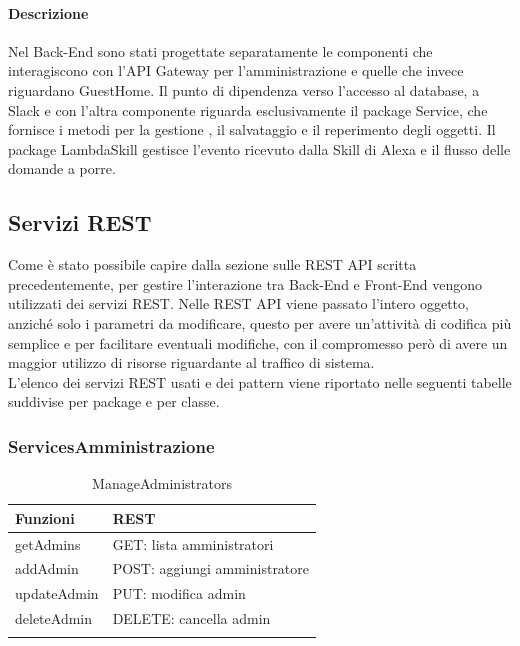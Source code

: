 \documentclass[../DefinizioneDiProdotto.tex]{subfiles}
\begin{document}
		\paragraph{Descrizione}

		Nel Back-End sono stati progettate separatamente le componenti che interagiscono con l'API Gateway per l'amministrazione e quelle che invece riguardano GuestHome. Il punto di dipendenza verso l'accesso al database, a Slack e con l'altra componente riguarda esclusivamente il package Service, che fornisce i metodi per la gestione , il salvataggio e il reperimento degli oggetti. Il package LambdaSkill gestisce l'evento ricevuto dalla Skill di Alexa e il flusso delle domande a porre.

	\newpage
	\subsection{Servizi REST}
Come è stato possibile capire dalla sezione sulle REST API scritta precedentemente, per
gestire l'interazione tra Back-End e Front-End vengono utilizzati dei servizi REST. Nelle
REST API viene passato l'intero oggetto, anziché solo i parametri da modificare, questo
per avere un'attività di codifica più semplice e per facilitare eventuali modifiche, con il
compromesso però di avere un maggior utilizzo di risorse riguardante al traffico di sistema.\\
L'elenco dei servizi REST usati e dei pattern viene riportato nelle seguenti tabelle suddivise per package e per classe.

	\subsubsection{ServicesAmministrazione}
	\begin{longtable}[c] { >{\centering\arraybackslash}p{3cm} >{\centering\arraybackslash}p{6cm}}
				\toprule
				\centerline{\textbf{Funzioni}} & \centerline{\textbf{REST}} \\
				\midrule
				getAdmins &  GET: lista amministratori \\
		 		\addlinespace[0.3em]
				\midrule
				\addlinespace[0.3em]
				addAdmin & POST: aggiungi amministratore \\
		 		\addlinespace[0.3em]
				\midrule
				\addlinespace[0.3em]
				updateAdmin & PUT: modifica admin \\
		 		\addlinespace[0.3em]
				\midrule
				\addlinespace[0.3em]
				deleteAdmin & DELETE: cancella admin \\

				\bottomrule
				\caption{ManageAdministrators}
		\end{longtable}
\end{document}
